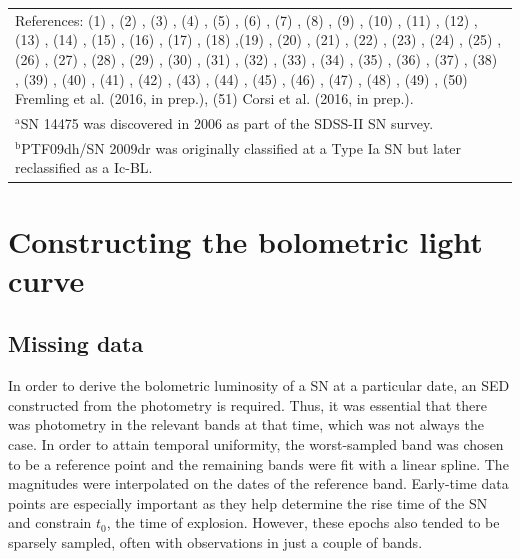 \documentclass[a4paper,fleqn,usenatbib]{mnras}
\begin{document}
\begin{table}
\begin{minipage}{125mm}
\begin{tabular}{lcccccc}
\multicolumn{7}{p{\textwidth}}{References: (1) \cite{Richmond1994}, (2) \cite{Richmond1996}, (3) \cite{Qiu1999}, (4) \cite{Clocchiatti2011}, (5) \cite{Patat2001}, (6) \cite{Benetti2011}, (7) \cite{Stritzinger2002}, (8) \cite{Foley2003}, (9) \cite{Galyam2002}, (10) \cite{Tomita2006}, (11) \cite{Hamuy2009}, (12) \cite{Deng2005}, (13) \cite{Valenti2008}, (14) \cite{Taubenberger2006}, (15) \cite{Bianco2014}, (16) \cite{Anupama2005}, (17) \cite{Taddia2015},  (18) \cite{Pian2006},(19) \cite{Mirabal2006}, (20) \cite{Kocevski2007}, (21) \cite{Hunter2009}, (22) \cite{Sahu2009}, (23) \cite{Roy2013}, (24) \cite{Stritzinger2009}, (25) \cite{Pastorello2008}, (26) \cite{Taubenberger2011}, (27) \cite{Mazzali2008}, (28) \cite{Modjaz2009}, (29) \cite{Pignata2011}, (30) \cite{Valenti2011}, (31) \cite{Folatelli2014}, (32) \cite{Bufano2012}, (33) \cite{Valenti2012}, (34) \cite{Marion2014}, (35) \cite{Mili2013B}, (36) \cite{Kumar2013}, (37) \cite{Bufano2014}, (38) \cite{Greiner2015}, (39) \cite{Mili2015}, (40) \cite{Melandri2012}, (41) \cite{Melandri2014}, (42) \cite{Galyam2014}, (43) \cite{MG2014}, (44) \cite{DElia2015}, (45) \cite{Drout2015}, (46) \cite{Fremling2014}, (47) \cite{Srivastav2014}, (48) \cite{BenAmi2012}, (49) \cite{Corsi2012}, (50) Fremling et al. (2016, in prep.), (51) Corsi et al. (2016, in prep.).}\\
\multicolumn{7}{p{\textwidth}}{$^{\mathrm{a}}$SN 14475 was discovered in 2006 as part of the SDSS-II SN survey.}\\
\multicolumn{7}{p{\textwidth}}{$^{\mathrm{b}}$PTF09dh/SN 2009dr was originally classified at a Type Ia SN but later reclassified as a Ic-BL.}
\end{tabular}
\end{minipage}
\end{table}

\section{Constructing the bolometric light curve}
\subsection{Missing data}
In order to derive the bolometric luminosity of a SN at a particular date, an SED constructed from the photometry is required. Thus, it was essential that there was photometry in the relevant bands at that time, which was not always the case. In order to attain temporal uniformity, the worst-sampled band was chosen to be a reference point and the remaining bands were fit with a linear spline. The magnitudes were interpolated on the dates of the reference band. Early-time data points are especially important as they help determine the rise time of the SN and constrain $t_0$, the time of explosion. However, these epochs also tended to be sparsely sampled, often with observations in just a couple of bands. 
\end{document}

